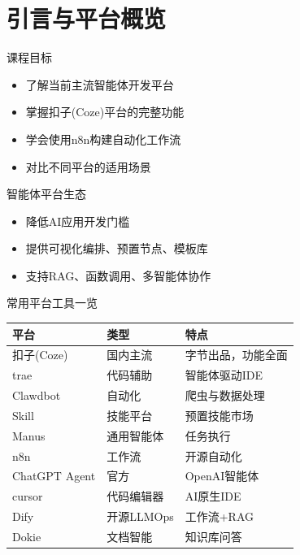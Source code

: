 \small
\section{引言与平台概览}

\begin{frame}{课程目标}
\begin{itemize}
    \item 了解当前主流智能体开发平台
    \item 掌握扣子(Coze)平台的完整功能
    \item 学会使用n8n构建自动化工作流
    \item 对比不同平台的适用场景
\end{itemize}
\end{frame}

\begin{frame}{智能体平台生态}
\begin{center}
\end{center}
\begin{itemize}
    \item 降低AI应用开发门槛
    \item 提供可视化编排、预置节点、模板库
    \item 支持RAG、函数调用、多智能体协作
\end{itemize}
\end{frame}

\begin{frame}{常用平台工具一览}
\begin{table}
\small
\begin{tabular}{lll}
\toprule
平台 & 类型 & 特点 \\
\midrule
扣子(Coze) & 国内主流 & 字节出品，功能全面 \\
trae & 代码辅助 & 智能体驱动IDE \\
Clawdbot & 自动化 & 爬虫与数据处理 \\
Skill & 技能平台 & 预置技能市场 \\
Manus & 通用智能体 & 任务执行 \\
n8n & 工作流 & 开源自动化 \\
ChatGPT Agent & 官方 & OpenAI智能体 \\
cursor & 代码编辑器 & AI原生IDE \\
Dify & 开源LLMOps & 工作流+RAG \\
Dokie & 文档智能 & 知识库问答 \\
\bottomrule
\end{tabular}
\end{table}
\end{frame}

